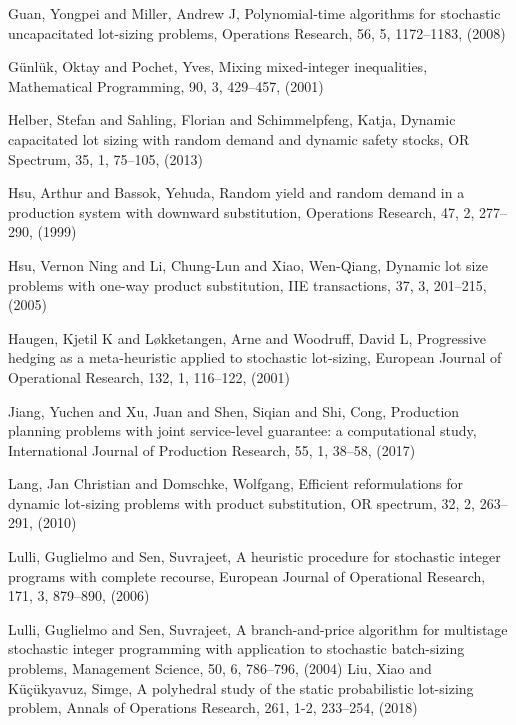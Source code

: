 \documentclass[11pt]{article}
\begin{document}
\begin{thebibliography}{99}
  Guan, Yongpei and Miller, Andrew J, Polynomial-time algorithms for stochastic uncapacitated lot-sizing problems,  Operations Research, 56, 5, 1172--1183,
(2008)

G{\"u}nl{\"u}k, Oktay and Pochet, Yves, Mixing mixed-integer inequalities, Mathematical Programming, 90, 3, 429--457, (2001)


 Helber, Stefan and Sahling, Florian and Schimmelpfeng, Katja, Dynamic capacitated lot sizing with random demand and dynamic safety stocks, OR Spectrum, 35, 1, 75--105, (2013)
 

Hsu, Arthur and Bassok, Yehuda, Random yield and random demand in a production system with downward substitution, Operations Research, 47, 2, 277--290,
  (1999)
  
Hsu, Vernon Ning and Li, Chung-Lun and Xiao, Wen-Qiang, Dynamic lot size problems with one-way product substitution, IIE transactions, 37, 3, 201--215, (2005)

Haugen, Kjetil K and L{\o}kketangen, Arne and Woodruff, David L, Progressive hedging as a meta-heuristic applied to stochastic lot-sizing, European Journal of Operational Research, 132, 1, 116--122, (2001)


 
 Jiang, Yuchen and Xu, Juan and Shen, Siqian and Shi, Cong, Production planning problems with joint service-level guarantee: a computational study, International Journal of Production Research, 55, 1, 38--58,
 (2017)
 
 Lang, Jan Christian and Domschke, Wolfgang, Efficient reformulations for dynamic lot-sizing problems with product substitution, OR spectrum,
32, 2, 263--291, (2010)

 Lulli, Guglielmo and Sen, Suvrajeet, A heuristic procedure for stochastic integer programs with complete recourse, European Journal of Operational Research,
171, 3, 879--890, (2006)

Lulli, Guglielmo and Sen, Suvrajeet, A branch-and-price algorithm for multistage stochastic integer programming with application to stochastic batch-sizing problems, Management Science, 50, 6, 786--796, (2004)
Liu, Xiao and K{\"u}{\c{c}}{\"u}kyavuz, Simge, A polyhedral study of the static probabilistic lot-sizing problem, Annals of Operations Research, 261, 1-2,
233--254, (2018)


\end{thebibliography}
\end{document}

